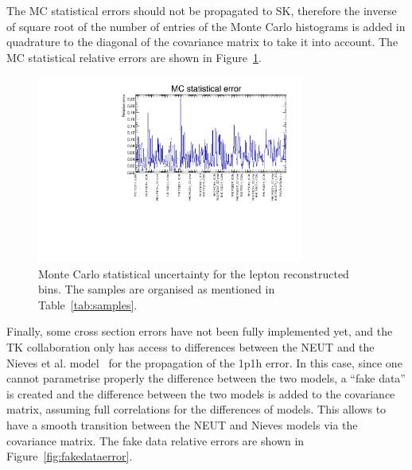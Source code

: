 The \Gls{MC} statistical errors should not be propagated to \Gls{SK},
therefore the inverse of square root of the number of entries of the
Monte Carlo histograms is added in quadrature to the diagonal of the
covariance matrix to take it into account. The \Gls{MC} statistical
relative errors are shown in Figure~\ref{fig:mcstaterror}.

\begin{figure}[ht]
  \begin{center}
    \includegraphics[width=0.78\textwidth]{images/BANFF/mc_stat_error_redu.pdf}
    \caption[Monte Carlo statistical uncertainty for the lepton
    reconstructed bins]{Monte Carlo statistical uncertainty for the
      lepton reconstructed bins. The samples are organised as mentioned
      in Table~\ref{tab:samples}.}
    \label{fig:mcstaterror}
  \end{center}
\end{figure}

Finally, some cross section errors have not been fully implemented
yet, and the \Gls{TK} collaboration only has access to differences
between the \Gls{NEUT} and the Nieves et al. model~\cite{NievesCCinc}
for the propagation of the 1p1h error. In this case, since one cannot
parametrise properly the difference between the two models, a ``fake
data'' is created and the difference between the two models is added
to the covariance matrix, assuming full correlations for the
differences of models. This allows to have a smooth transition between
the \Gls{NEUT} and Nieves models via the covariance matrix. The fake
data relative errors are shown in Figure~\ref{fig:fakedataerror}.

